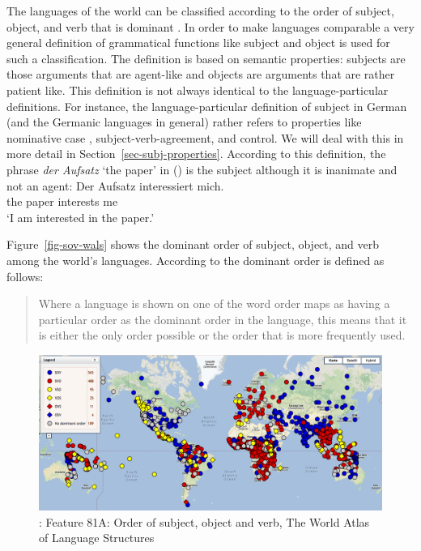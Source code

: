 The languages of the world can be classified according to the order of subject, object, and verb
that is dominant \citep{Greenberg63a-u}. In order to make languages comparable a very general definition of grammatical
functions like subject and object is used
for such a classification. The definition is based on semantic properties: subjects are those
arguments that are agent-like and objects are arguments that are rather patient like. This definition
is not always identical to the language-particular definitions. For instance, the
language-particular definition of subject in German (and the Germanic languages in general)
rather refers to properties like nominative case \citep{Reis82}, subject-verb-agreement, and control. We will deal with this in more
detail in Section~\ref{sec-subj-properties}. According to this definition, the phrase \emph{der
  Aufsatz} `the paper' in () is the subject although it is inanimate and not an agent: 
\ea
\gll Der Aufsatz interessiert mich.\\
     the paper   interests    me\\
\glt `I am interested in the paper.'
\z

Figure~\vref{fig-sov-wals} shows the dominant order of subject, object, and verb among the world's languages.
According to \citet{Dryer2013a} the dominant order is defined as follows:

\begin{quote}
Where a language is shown on one of the word order maps as having a particular order as the dominant
order in the language, this means that it is either the only order possible or the order
that is more frequently used. \citep{Dryer2013a}
\end{quote}
%
%
%
\begin{figure}
\includegraphics[width=\textwidth]{Pictures/WALS-SOV}
\caption{\label{fig-sov-wals}\citet[Section~1]{Dryer2013c}: Feature 81A: Order of subject, object and verb, The World Atlas of Language Structures} 
\end{figure}

